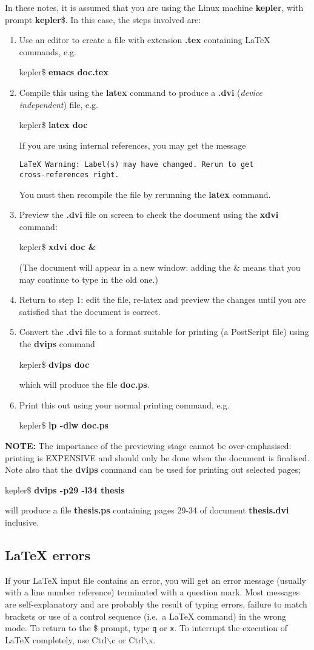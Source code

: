 \documentclass[11pt,a4]{article}
\newcommand{\bc}{\begin{center}}
\newcommand{\ec}{\end{center}}
\newcommand{\ben}{\begin{enumerate}}
\newcommand{\een}{\end{enumerate}}
\newcommand{\lx}{{\LaTeX} }
\begin{document}
In these notes, it is assumed that you are using the Linux machine 
\textbf{kepler}, with prompt \textbf{kepler}\$. 
In this case, the steps involved are:
\ben
\item Use an editor to create a file with extension \textbf{.tex}
containing \lx commands, e.g.\
\bc
kepler\$ \textbf{emacs doc.tex}
\ec
\item Compile this using the \textbf{latex} command to produce a \textbf{
.dvi} (\textit{device independent}) file, e.g.\
\bc
kepler\$ \textbf{latex doc}
\ec
If you are using internal references, you may get the message 
\begin{verbatim}
LaTeX Warning: Label(s) may have changed. Rerun to get
cross-references right.
\end{verbatim}
You must then recompile the file by rerunning the \textbf{latex}
command.

\item Preview the \textbf{.dvi} file on screen to check the document
using the \textbf{xdvi} command:
\bc
kepler\$ \textbf{xdvi doc \&}
\ec
(The document will appear in a new window: adding the \& means
that you may continue to type in the old one.)

\item Return to step 1: edit the file, re-latex and preview the
changes until you are satisfied that the document is correct.

\item Convert the \textbf{.dvi} file to a format suitable for
printing (a PostScript file) using the \textbf{dvips} command
\bc
kepler\$ \textbf{dvips doc}
\ec
which will produce the file \textbf{doc.ps}.

\item Print this out using your normal printing command, e.g.\
\bc
kepler\$ \textbf{lp -dlw doc.ps}
\ec
\een

\textbf{NOTE:}
The importance of the previewing stage cannot be
over-emphasised: printing is EXPENSIVE and should only be done when the
document is finalised.
Note also that the \textbf{dvips} command can be used for printing
out selected pages;
\bc
kepler\$ \textbf{dvips -p29 -l34 thesis}
\ec
will produce a file \textbf{thesis.ps} containing pages 29-34 of document
\textbf{thesis.dvi} inclusive.\\

\subsection{\lx errors}
If your \lx input file contains an error, you will get
an error message (usually with a line number reference) terminated with
a question mark. Most messages are self-explanatory and are
probably the result of typing errors, failure to match brackets or
use of a control sequence (i.e.\ a \lx command) in the wrong
mode. To return to the \$ prompt, type \verb+q+ or \verb+x+. To
interrupt the execution of \lx completely, use Ctrl$\backslash$c or 
Ctrl$\backslash$x.
\end{document}

